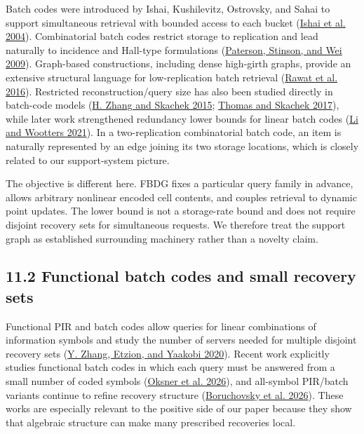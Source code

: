 \documentclass[
]{article}
\begin{document}
Batch codes were introduced by Ishai, Kushilevitz, Ostrovsky, and Sahai
to support simultaneous retrieval with bounded access to each bucket
(\protect\hyperlink{ref-ishai2004batch}{Ishai et al. 2004}).
Combinatorial batch codes restrict storage to replication and lead
naturally to incidence and Hall-type formulations
(\protect\hyperlink{ref-paterson2009cbc}{Paterson, Stinson, and Wei
2009}). Graph-based constructions, including dense high-girth graphs,
provide an extensive structural language for low-replication batch
retrieval (\protect\hyperlink{ref-rawat2016batchgraphs}{Rawat et al.
2016}). Restricted reconstruction/query size has also been studied
directly in batch-code models
(\protect\hyperlink{ref-zhang2015restricted}{H. Zhang and Skachek 2015};
\protect\hyperlink{ref-thomas2017restricted}{Thomas and Skachek 2017}),
while later work strengthened redundancy lower bounds for linear batch
codes (\protect\hyperlink{ref-li2021improved}{Li and Wootters 2021}). In
a two-replication combinatorial batch code, an item is naturally
represented by an edge joining its two storage locations, which is
closely related to our support-system picture.

The objective is different here. FBDG fixes a particular query family in
advance, allows arbitrary nonlinear encoded cell contents, and couples
retrieval to dynamic point updates. The lower bound is not a
storage-rate bound and does not require disjoint recovery sets for
simultaneous requests. We therefore treat the support graph as
established surrounding machinery rather than a novelty claim.

\hypertarget{functional-batch-codes-and-small-recovery-sets}{%
\subsection{11.2 Functional batch codes and small recovery
sets}\label{functional-batch-codes-and-small-recovery-sets}}

Functional PIR and batch codes allow queries for linear combinations of
information symbols and study the number of servers needed for multiple
disjoint recovery sets (\protect\hyperlink{ref-zhang2020functional}{Y.
Zhang, Etzion, and Yaakobi 2020}). Recent work explicitly studies
functional batch codes in which each query must be answered from a small
number of coded symbols
(\protect\hyperlink{ref-oksner2026functional}{Oksner et al. 2026}), and
all-symbol PIR/batch variants continue to refine recovery structure
(\protect\hyperlink{ref-boruchovsky2026allsymbol}{Boruchovsky et al.
2026}). These works are especially relevant to the positive side of our
paper because they show that algebraic structure can make many
prescribed recoveries local.
\end{document}
